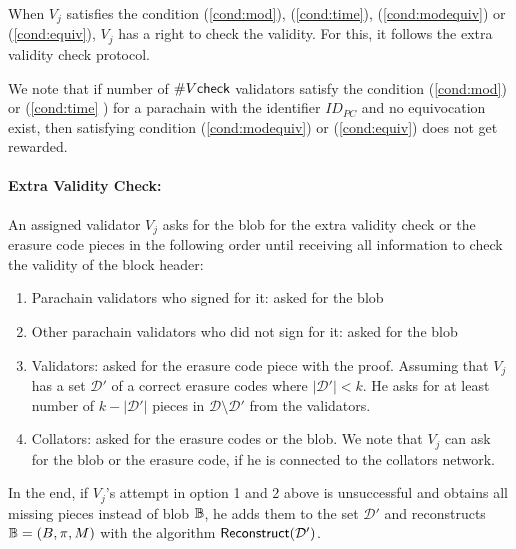\begin{enumerate}
    When $V_j$ satisfies the condition (\ref{cond:mod}), (\ref{cond:time}), (\ref{cond:modequiv}) or (\ref{cond:equiv}), $V_j$ has a right to check the validity. For this, it follows the extra validity check protocol.
    
    We note that if number of $\#V\mathsf{check}$ validators satisfy the condition (\ref{cond:mod}) or (\ref{cond:time} ) for a parachain with the identifier $ID_{PC}$ and no equivocation exist, then satisfying condition (\ref{cond:modequiv}) or (\ref{cond:equiv}) does not get rewarded.
    
\end{enumerate}


\paragraph{Extra Validity Check:}
An assigned validator $V_j$  asks for the blob for the extra validity check or the erasure code pieces in the following order until receiving all information to check the validity of the block header:
\begin{enumerate}
    \item Parachain validators who signed for it: asked for the blob
    \item Other parachain validators who did not sign for it: asked for the blob
    \item Validators: asked for the erasure code piece with the proof. Assuming that $V_j$ has a set $\mathcal{D}'$ of a correct erasure codes where $|\mathcal{D}'|<k$. He asks for at least number of $k-|\mathcal{D}'|$ pieces in $\mathcal{D}\setminus \mathcal{D}'$ from the validators.
    
    \item Collators: asked for the erasure codes or the blob. We note that $V_j$ can ask for the blob or the erasure code, if he is connected to the collators network.
    
\end{enumerate}

In the end,  if $V_j$'s attempt in option 1 and 2 above is unsuccessful and  obtains all missing pieces instead of blob $\mathbb{B}$, he adds them to the set $\mathcal{D}'$ and reconstructs  $\mathbb{B} = (B,\pi,M)$ with the algorithm $\mathsf{Reconstruct}(\mathcal{D}')$. 

